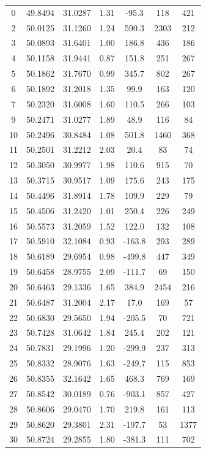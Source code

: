 \begin{longtable}{ccccccc}
0 & 49.8494 & 31.0287 & 1.31 & -95.3 & 118 & 421 \\
2 & 50.0125 & 31.1260 & 1.24 & 590.3 & 2303 & 212 \\
3 & 50.0893 & 31.6401 & 1.00 & 186.8 & 436 & 186 \\
4 & 50.1158 & 31.9441 & 0.87 & 151.8 & 251 & 267 \\
5 & 50.1862 & 31.7670 & 0.99 & 345.7 & 802 & 267 \\
6 & 50.1892 & 31.2018 & 1.35 & 99.9 & 163 & 120 \\
7 & 50.2320 & 31.6008 & 1.60 & 110.5 & 266 & 103 \\
9 & 50.2471 & 31.0277 & 1.89 & 48.9 & 116 & 84 \\
10 & 50.2496 & 30.8484 & 1.08 & 501.8 & 1460 & 368 \\
11 & 50.2501 & 31.2212 & 2.03 & 20.4 & 83 & 74 \\
12 & 50.3050 & 30.9977 & 1.98 & 110.6 & 915 & 70 \\
13 & 50.3715 & 30.9517 & 1.09 & 175.6 & 243 & 175 \\
14 & 50.4496 & 31.8914 & 1.78 & 109.9 & 229 & 79 \\
15 & 50.4506 & 31.2420 & 1.01 & 250.4 & 226 & 249 \\
16 & 50.5573 & 31.2059 & 1.52 & 122.0 & 132 & 108 \\
17 & 50.5910 & 32.1084 & 0.93 & -163.8 & 293 & 289 \\
18 & 50.6189 & 29.6954 & 0.98 & -499.8 & 447 & 349 \\
19 & 50.6458 & 28.9755 & 2.09 & -111.7 & 69 & 150 \\
20 & 50.6463 & 29.1336 & 1.65 & 384.9 & 2454 & 216 \\
21 & 50.6487 & 31.2004 & 2.17 & 17.0 & 169 & 57 \\
22 & 50.6830 & 29.5650 & 1.94 & -205.5 & 70 & 721 \\
23 & 50.7428 & 31.0642 & 1.84 & 245.4 & 202 & 121 \\
24 & 50.7831 & 29.1996 & 1.20 & -299.9 & 237 & 313 \\
25 & 50.8332 & 28.9076 & 1.63 & -249.7 & 115 & 853 \\
26 & 50.8355 & 32.1642 & 1.65 & 468.3 & 769 & 169 \\
27 & 50.8542 & 30.0189 & 0.76 & -903.1 & 857 & 427 \\
28 & 50.8606 & 29.0470 & 1.70 & 219.8 & 161 & 113 \\
29 & 50.8620 & 29.3801 & 2.31 & -197.7 & 53 & 1377 \\
30 & 50.8724 & 29.2855 & 1.80 & -381.3 & 111 & 702 \\

\end{longtable}
